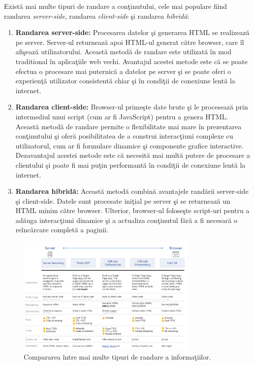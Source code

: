 \documentclass[12pt, a4paper]{report}
\begin{document}
Exist\u a mai multe tipuri de randare a con\c tinutului, cele mai populare fiind randarea \emph{server-side}, randarea \emph{client-side} \c si randarea \emph{hibrid\u a}: \cite{clientsidevssercerside}
\begin{enumerate}
	\item \textbf{Randarea server-side:} Procesarea datelor \c si generarea HTML se realizeaz\u a pe server. Server-ul returneaz\u a apoi HTML-ul generat c\u atre browser, care \^il afi\c seaz\u a utilizatorului. Aceast\u a metod\u a de randare este utilizat\u a \^in mod traditional \^in aplica\c tiile web vechi. Avantajul acestei metode este c\u a se poate efectua o procesare mai puternic\u a a datelor pe server \c si se poate oferi o experien\c t\u a utilizator consistent\u a chiar \c si \^in condi\c tii de conexiune lent\u a la internet.
	\item \textbf{Randarea client-side:} Browser-ul prime\c ste date brute \c si le proceseaz\u a prin intermediul unui script (cum ar fi JavaScript) pentru a genera HTML. Aceast\u a metod\u a de randare permite o flexibilitate mai mare \^in prezentarea con\c tinutului \c si ofer\u a posibilitatea de a construi interac\c tiuni complexe cu utilizatorul, cum ar fi formulare dinamice \c si componente grafice interactive. Dezavantajul acestei metode este c\u a necesit\u a mai mult\u a putere de procesare a clientului \c si poate fi mai pu\c tin performant\u a \^in condi\c tii de conexiune lent\u a la internet.
	\item \textbf{Randarea hibrid\u a:} Aceast\u a metod\u a combin\u a avantajele rand\u arii server-side \c si client-side. Datele sunt procesate ini\c tial pe server \c si se returneaz\u a un HTML minim c\u atre browser. Ulterior, browser-ul folose\c ste script-uri pentru a ad\u auga interac\c tiuni dinamice \c si a actualiza con\c tinutul f\u ar\u a a fi necesar\u a o re\^inc\u arcare complet\u a a paginii.
\end{enumerate}

\begin{figure}[htbp]
	\centering
	\includegraphics[width=0.78\textwidth]{rendering.png}
	\caption{Compararea \^intre mai multe tipuri de randare a informa\c tiilor. \cite{webdev}}
\end{figure}
\end{document}
